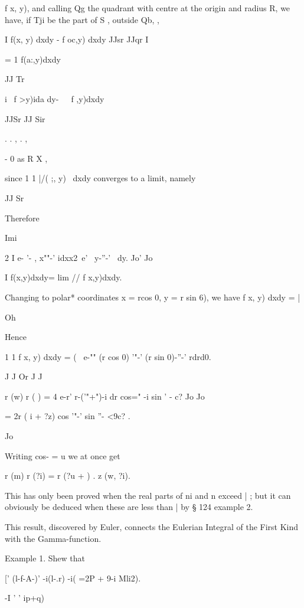 f x, y), and calling Qg the quadrant with centre at the origin and
radius R, we have, if Tji be the part of S , outside Qb, ,

I f(x, y) dxdy - f oc,y) dxdy JJsr JJqr I

= 1 f(a:,y)dxdy

 JJ Tr

i \ f >y)ida dy-\ \ \ f ,y)dxdy\

JJSr JJ Sir



  . . , . ,

- 0 as R X ,

since 1 1 |/( ;, y) \ dxdy converges to a limit, namely

JJ Sr



Therefore



Imi



2 I e- '- , x""-' idxx2\ e' \ y-''-' \ dy. Jo' Jo

I f(x,y)dxdy= lim // f x,y)dxdy.



Changing to polar* coordinates x = rcos 0, y = r sin 6), we have f x,
y) dxdy = |

Oh

Hence



1 1 f x, y) dxdy = ( \ e-"" (r cos 0) '"-' (r sin 0)-''-' rdrd0.

J J Or J J



r (w) r ( ) = 4 e-r' r-('"+")-i dr cos=" -i sin ' - c? Jo Jo

= 2r ( i + ?z) cos '"-' sin ''- <9c? .

Jo



Writing cos- = u we at once get

r (m) r (?i) = r (?u + ) . z (w, ?i).

This has only been proved when the real parts of ni and n exceed | ;
but it can obviously be deduced when these are less than | by § 124
example 2.

This result, discovered by Euler, connects the Eulerian Integral of
the First Kind with the Gamma-function.

Example 1. Shew that

[' (l-f-A-)' -i(l-.r) -i( =2P + 9-i Mli2).

  -I ' ' ip+q)

